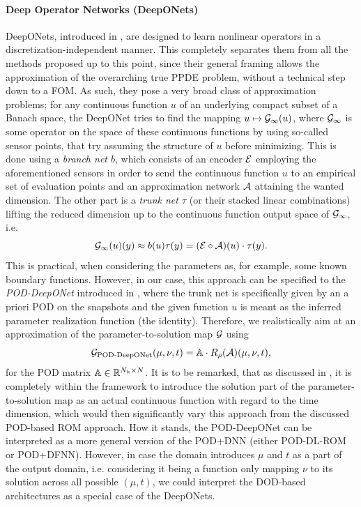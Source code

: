 \paragraph{Deep Operator Networks (DeepONets)}
DeepONets, introduced in \cite{lu2021}, are designed to learn
nonlinear operators in a discretization-independent manner. This completely separates
them from all the methods proposed up to this point, since
their general framing allows the approximation of the overarching true PPDE problem,
without a technical step down to a FOM. As such, they pose a very
broad class of approximation problems; for any continuous function $u$ of an underlying 
compact subset of a Banach space, the DeepONet tries to find the mapping 
$u \mapsto \mathcal{G}_\infty(u)$, where $\mathcal{G}_\infty$ is some operator on the space of these
continuous functions by using so-called sensor points,
that try assuming the structure of $u$ before minimizing. 
This is done using a \emph{branch net $b$}, which consists of
an encoder $\mathcal{E}$ employing the aforementioned sensors in order
to send the continuous function $u$ to an empirical set of evaluation points
and an approximation network $\mathcal{A}$ attaining the wanted dimension. The other part is a \emph{trunk net $\tau$} (or
their stacked linear combinations) lifting the reduced dimension up to the continuous function
output space of $\mathcal{G}_\infty$, i.e.
\begin{equation*}
    \mathcal{G}_\infty(u)(y) \approx b(u) \tau(y) = (\mathcal{E} \circ \mathcal{A})(u) \cdot \tau(y).
\end{equation*}
This is practical, when considering the parameters
as, for example, some known boundary functions. However, in our case, this approach can be 
specified to the \emph{POD-DeepONet} introduced in \cite{lu2022}, where the trunk net is
specifically given by an a priori POD on the snapshots and the given function $u$ is meant
as the inferred parameter realization function (the identity). Therefore, we
realistically aim at an approximation of the parameter-to-solution map $\mathcal{G}$ using
\begin{equation*}
    \mathcal{G}_\text{POD-DeepONet}(\mu, \nu, t) = \mathbb{A} \cdot R_\rho(\mathcal{A})(\mu, \nu, t),
\end{equation*}
for the POD matrix $\mathbb{A} \in \mathbb{R}^{N_h \times N}$.
It is to be remarked, that as discussed in \cite{brivio2023}, it is completely within the framework 
to introduce the solution part of the parameter-to-solution map as an actual continuous function
with regard to the time dimension, which would then significantly vary this approach from
the discussed POD-based ROM approach. How it stands, the POD-DeepONet can be interpreted as a more 
general version of the POD+DNN (either POD-DL-ROM or POD+DFNN). However, in case the domain introduces
$\mu$ and $t$ as a part of the output domain, i.e. considering it being a function only
mapping $\nu$ to its solution across all possible $(\mu, t)$, we could interpret the DOD-based
architectures as a special case of the DeepONets.

